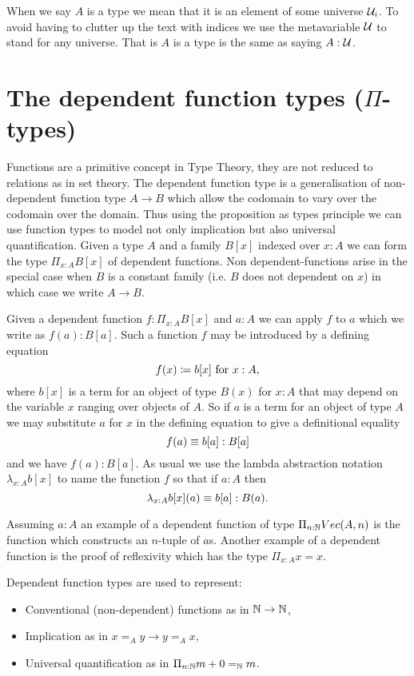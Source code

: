 When we say $A$ is a type we mean that it is an element of some
universe $\mathcal{U}_i$. To avoid having to clutter up the text with indices
we use the metavariable $\mathcal{U}$ to stand for any universe. That is $A$
is a type is the same as saying $A : \mathcal{U}$.

\section{The dependent function types ($\Pi$-types)}

Functions are a primitive concept in Type Theory, they are not reduced
to relations as in set theory. The dependent function type is a
generalisation of non-dependent function type $A \to B$ which allow
the codomain to vary over the codomain over the domain. Thus using the
proposition as types principle we can use function types to model not
only implication but also universal quantification. Given a type $A$
and a family $B[x]$ indexed over $x:A$ we can form the type
$\Pi_{x:A}B[x]$ of dependent functions. Non dependent-functions arise
in the special case when $B$ is a constant family (i.e. $B$ does not
dependent on $x$) in which case we write $A \to B$.

Given a dependent function $f : \Pi_{x:A}B[x]$ and $a : A$ we can
apply $f$ to $a$ which we write as $f(a) : B[a]$.  Such a function $f$ may be introduced by a defining equation
  \[ f(x)\coloneqq b[x]\mbox{ for } x:A,\]
where $b[x]$ is a term for an object of type $B(x)$ for $x:A$ that may depend on the variable $x$ ranging over objects of $A$.  So if $a$ is a term for an object of type $A$ we may substitute $a$ for $x$ in the defining equation to give a definitional equality
  \[ f(a)\equiv b[a]:B[a]\]
and we have $f(a):B[a]$.  As usual we use the lambda abstraction notation 
$\lambda_{x:A}b[x]$ to name the function $f$ so that if $a:A$ then
  \[\lambda_{x:A}b[x](a)\equiv b[a]: B(a).\]

Assuming $a:A$ an example of a dependent function of type $\Pi_{n:\mathbb{N}}Vec(A,n)$
is the function which constructs an $n$-tuple of $a$s. Another example
of a dependent function is the proof of reflexivity which has the type
$\Pi_{x:A}x = x$.

Dependent function types are used to represent:
\begin{itemize}
\item Conventional (non-dependent) functions as in $\mathbb{N} \to \mathbb{N}$,
\item Implication as in $x =_A y \to y =_A x$,
\item Universal quantification as in $\Pi_{n:\mathbb{N}}m+0 =_\mathbb{N} m$.
\end{itemize}

